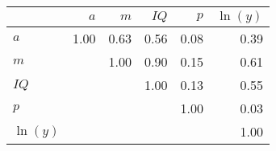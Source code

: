 \begin{tabular}{lrrrrr}
\hline
 & $a$  & $m$  & $IQ$  & $p$  & $\ln(y)$  \\ 
\hline
$a$ & 1.00  & 0.63  & 0.56  & 0.08  & 0.39  \\ 
$m$ &   & 1.00  & 0.90  & 0.15  & 0.61  \\ 
$IQ$ &   &   & 1.00  & 0.13  & 0.55  \\ 
$p$ &   &   &   & 1.00  & 0.03  \\ 
$\ln(y)$ &   &   &   &   & 1.00  \\ 
\hline
\end{tabular}%
